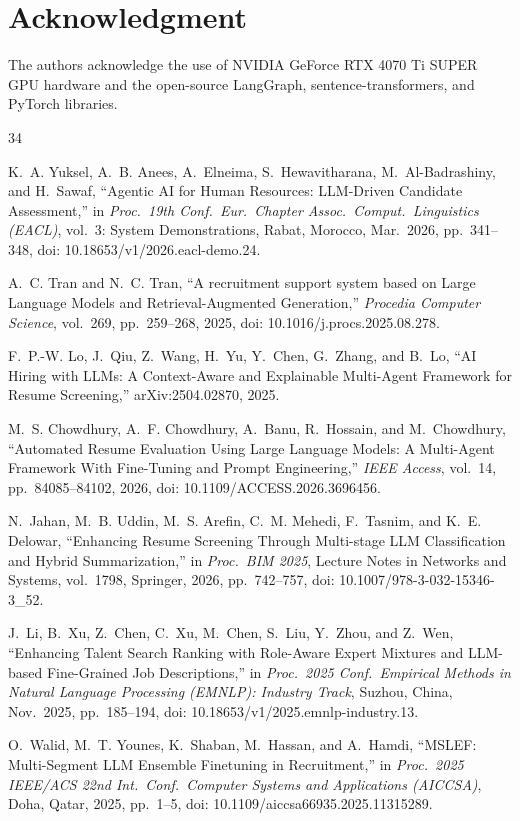 \documentclass[journal]{IEEEtran}
\begin{document}
\section*{Acknowledgment}
The authors acknowledge the use of NVIDIA GeForce RTX 4070 Ti SUPER GPU hardware and the open-source LangGraph, sentence-transformers, and PyTorch libraries.

\begin{thebibliography}{34}

K.~A. Yuksel, A.~B. Anees, A.~Elneima, S.~Hewavitharana, M.~Al-Badrashiny, and H.~Sawaf, ``Agentic AI for Human Resources: LLM-Driven Candidate Assessment,'' in \emph{Proc.\ 19th Conf.\ Eur.\ Chapter Assoc.\ Comput.\ Linguistics (EACL)}, vol.~3: System Demonstrations, Rabat, Morocco, Mar.~2026, pp.~341--348, doi: 10.18653/v1/2026.eacl-demo.24.

A.~C. Tran and N.~C. Tran, ``A recruitment support system based on Large Language Models and Retrieval-Augmented Generation,'' \emph{Procedia Computer Science}, vol.~269, pp.~259--268, 2025, doi: 10.1016/j.procs.2025.08.278.

F.~P.-W. Lo, J.~Qiu, Z.~Wang, H.~Yu, Y.~Chen, G.~Zhang, and B.~Lo, ``AI Hiring with LLMs: A Context-Aware and Explainable Multi-Agent Framework for Resume Screening,'' arXiv:2504.02870, 2025.

M.~S. Chowdhury, A.~F. Chowdhury, A.~Banu, R.~Hossain, and M.~Chowdhury, ``Automated Resume Evaluation Using Large Language Models: A Multi-Agent Framework With Fine-Tuning and Prompt Engineering,'' \emph{IEEE Access}, vol.~14, pp.~84085--84102, 2026, doi: 10.1109/ACCESS.2026.3696456.

N.~Jahan, M.~B. Uddin, M.~S. Arefin, C.~M. Mehedi, F.~Tasnim, and K.~E. Delowar, ``Enhancing Resume Screening Through Multi-stage LLM Classification and Hybrid Summarization,'' in \emph{Proc.\ BIM 2025}, Lecture Notes in Networks and Systems, vol.~1798, Springer, 2026, pp.~742--757, doi: 10.1007/978-3-032-15346-3\_52.

J.~Li, B.~Xu, Z.~Chen, C.~Xu, M.~Chen, S.~Liu, Y.~Zhou, and Z.~Wen, ``Enhancing Talent Search Ranking with Role-Aware Expert Mixtures and LLM-based Fine-Grained Job Descriptions,'' in \emph{Proc.\ 2025 Conf.\ Empirical Methods in Natural Language Processing (EMNLP): Industry Track}, Suzhou, China, Nov.~2025, pp.~185--194, doi: 10.18653/v1/2025.emnlp-industry.13.

O.~Walid, M.~T. Younes, K.~Shaban, M.~Hassan, and A.~Hamdi, ``MSLEF: Multi-Segment LLM Ensemble Finetuning in Recruitment,'' in \emph{Proc.\ 2025 IEEE/ACS 22nd Int.\ Conf.\ Computer Systems and Applications (AICCSA)}, Doha, Qatar, 2025, pp.~1--5, doi: 10.1109/aiccsa66935.2025.11315289.


\end{thebibliography}
\end{document}
